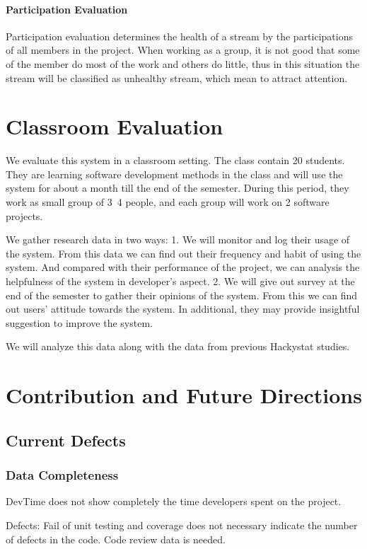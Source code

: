 \subsubsection{Participation Evaluation}
Participation evaluation determines the health of a stream by the participations of all members in the project. When working as a group, it is not good that some of the member do most of the work and others do little, thus in this situation the stream will be classified as unhealthy stream, which mean to attract attention.

\chapter{Classroom Evaluation}
We evaluate this system in a classroom setting. The class contain 20 students. They are learning software development methods in the class and will use the system for about a month till the end of the semester. During this period, they work as small group of 3~4 people, and each group will work on 2 software projects.

We gather research data in two ways:
	1. We will monitor and log their usage of the system. From this data we can find out their frequency and habit of using the system. And compared with their performance of the project, we can analysis the helpfulness of the system in developer's aspect. 
	2. We will give out survey at the end of the semester to gather their opinions of the system. From this we can find out users' attitude towards the system. In additional, they may provide insightful suggestion to improve the system.

We will analyze this data along with the data from previous Hackystat studies.

\chapter{Contribution and Future Directions}

\section{Current Defects}

\subsection{Data Completeness}

DevTime does not show completely the time developers spent on the project. 

Defects: Fail of unit testing and coverage does not necessary indicate the number of defects in the code. Code review data is needed. 


